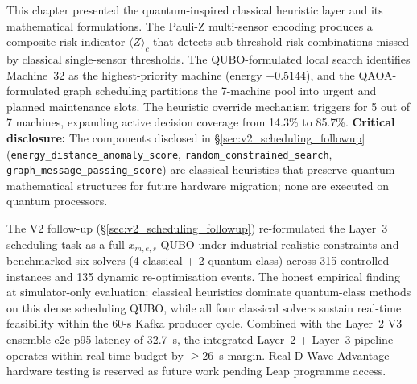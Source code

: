 This chapter presented the quantum-inspired classical heuristic layer and its mathematical formulations. The Pauli-Z multi-sensor encoding produces a composite risk indicator $\langle Z \rangle_c$ that detects sub-threshold risk combinations missed by classical single-sensor thresholds. The QUBO-formulated local search identifies Machine~32 as the highest-priority machine (energy $-0.5144$), and the QAOA-formulated graph scheduling partitions the 7-machine pool into urgent and planned maintenance slots. The heuristic override mechanism triggers for 5 out of 7 machines, expanding active decision coverage from 14.3\% to 85.7\%. \textbf{Critical disclosure:} The components disclosed in §\ref{sec:v2_scheduling_followup} (\texttt{energy\_distance\_anomaly\_score}, \texttt{random\_constrained\_search}, \texttt{graph\_message\_passing\_score}) are classical heuristics that preserve quantum mathematical structures for future hardware migration; none are executed on quantum processors.

The V2 follow-up (§\ref{sec:v2_scheduling_followup}) re-formulated the Layer~3 scheduling task as a full $x_{m,e,s}$ QUBO under industrial-realistic constraints and benchmarked six solvers (4 classical + 2 quantum-class) across 315 controlled instances and 135 dynamic re-optimisation events. The honest empirical finding at simulator-only evaluation: classical heuristics dominate quantum-class methods on this dense scheduling QUBO, while all four classical solvers sustain real-time feasibility within the 60-s Kafka producer cycle. Combined with the Layer~2 V3 ensemble e2e p95 latency of 32.7~s, the integrated Layer~2 + Layer~3 pipeline operates within real-time budget by $\geq 26$~s margin. Real D-Wave Advantage hardware testing is reserved as future work pending Leap programme access.
